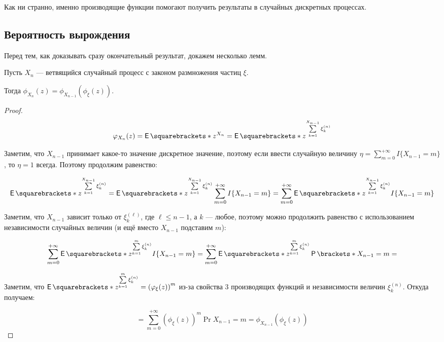 Как ни странно, именно производящие функции помогают получить результаты в случайных
дискретных процессах.

\subsection{Вероятность вырождения}

Перед тем, как доказывать сразу окончательный результат, докажем несколько лемм.

\begin{lemma}[О зависимости $X_n$ и $X_{n - 1}$]
  Пусть $X_n$ --- ветвящийся случайный процесс с законом размножения частиц $\xi$.

  Тогда $\phi_{X_n}(z) = \phi_{X_{n - 1}}(\phi_\xi(z))$.
\end{lemma}

\begin{proof}
  \[
    \phi_{X_n}(z) = \E{z^{X_n}} = \E{z^{\sum\limits_{k = 1}^{X_{n - 1}} \xi_k^{(n)}}}
  \]

  Заметим, что $X_{n - 1}$ принимает какое-то значение дискретное значение,
  поэтому если ввести случайную величину $\eta = \sum\limits_{m = 0}^{+\infty} 
  I\{X_{n - 1} = m\}$, то $\eta = 1$ всегда. Поэтому продолжим равенство:

  \[
    \E{z^{\sum\limits_{k = 1}^{X_{n - 1}} \xi_k^{(n)}}} =
    \E{z^{\sum\limits_{k = 1}^{X_{n - 1}} \xi_k^{(n)}} \sum\limits_{m = 0}^{+\infty} 
    I\{X_{n - 1} = m\}} = \sum\limits_{m = 0}^{+\infty} \E{z^{\sum\limits_{k = 
    1}^{X_{n - 1}} \xi_k^{(n)}}I\{X_{n - 1} = m\}}
  \]

  Заметим, что $X_{n - 1}$ зависит только от $\xi_k^{(\ell)}$, где $\ell \leq n - 1$,
  а $k$ --- любое, поэтому можно продолжить равенство с использованием
  независимости случайных величин (и ещё вместо $X_{n - 1}$
  подставим $m$):

  \[
    \sum\limits_{m = 0}^{+\infty} \E{z^{\sum\limits_{k = 1}^{m}
    \xi_k^{(n)}}I\{X_{n - 1} = m\}} = \sum\limits_{m = 0}^{+\infty} \E{z^{\sum\limits_{k = 1}^{m}
    \xi_k^{(n)}}} \Pr{X_{n - 1} = m} = 
  \]

  Заметим, что $\E{z^{\sum\limits_{k = 1}^{m} \xi_k^{(n)}}} = 
  \left(\phi_{\xi}(z)\right)^m$ из-за свойства 3 производящих функций и независимости
  величин $\xi_k^{(n)}$. Откуда получаем:

  \[
    = \sum\limits_{m = 0}^{+\infty} \left(\phi_{\xi}(z)\right)^m \Pr{X_{n - 1} = m} =
    \phi_{X_{n - 1}}(\phi_{\xi}(z))
  \]
\end{proof}

